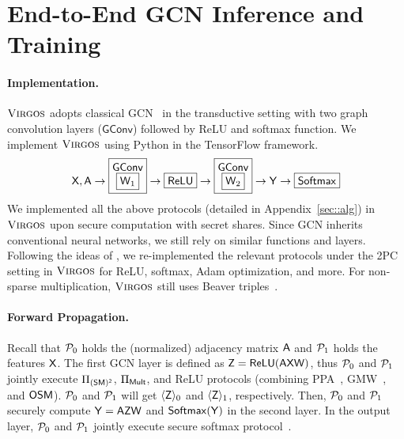 \section{End-to-End GCN Inference and Training}
\label{sec::secgcn}

\paragraph{Implementation.}
$\textnormal{\textsc{Virgos}}$ adopts classical GCN~\cite{iclr/KipfW17} in the transductive setting with
two graph convolution layers ($\mathsf{GConv}$) 
followed by ReLU and softmax function.
We implement $\textnormal{\textsc{Virgos}}$ using Python
in the TensorFlow framework.
\begin{equation*}
\begin{aligned}
\mathsf{X},\mathsf{A}
	\rightarrow 
\boxed{
	\stackrel{\textstyle{\mathsf{GConv}}}{\boxed{\mathsf{W}_{1}}}
}
	\rightarrow 
 	\boxed{ {\mathsf{{ReLU}}}}
	\rightarrow 
\boxed{
	\stackrel{\textstyle{\mathsf{GConv}}}{\boxed{\mathsf{W}_{2}}}
}
	\rightarrow
	\mathsf{Y}
	\rightarrow 
 	 	\boxed{ {\mathsf{{Softmax}}}} 
 	 	\end{aligned}
 	\end{equation*}
We implemented all the above protocols (detailed in Appendix~\ref{sec::alg}) in $\textnormal{\textsc{Virgos}}$
upon secure computation with secret shares.
Since GCN inherits conventional neural networks, we still rely on similar functions and layers.
Following the ideas of \cite{sp/MohasselZ17,ccs/RatheeRKCGRS20,uss/WatsonWP22,acsac/0021ZCPTLY23,popets/AttrapadungHIKM22},
we re-implemented the relevant protocols under the 2PC setting in $\textnormal{\textsc{Virgos}}$ for ReLU,
softmax, Adam optimization, and more.
For non-sparse multiplication, $\textnormal{\textsc{Virgos}}$ still uses Beaver triples~\cite{crypto/Beaver91a}.

\paragraph{Forward Propagation.}
Recall that $\mathcal{P}_0$ holds the (normalized) adjacency matrix $\mathsf{A}$ and $\mathcal{P}_1$ holds the features $\mathsf{X}$.
The first GCN layer is defined as $\mathsf{Z} =\mathsf{ReLU}(\mathsf{A}\mathsf{X} \mathsf{W})$, thus $\mathcal{P}_0$ and $\mathcal{P}_1$ jointly execute $\Pi_{\mathsf{(SM)^2}}$, $\Pi_{\mathsf{Mult}}$, and ReLU protocols (combining PPA~\cite{arith/Beaumont-SmithL01}, GMW~\cite{acssc/Harris03}, and $\mathsf{OSM}$).
$\mathcal{P}_0$ and $\mathcal{P}_1$ will get $\langle \mathsf{Z}\rangle_0$ and $\langle \mathsf{Z}\rangle_1$, respectively.
Then, $\mathcal{P}_0$ and $\mathcal{P}_1$ securely compute $\mathsf{Y}= \mathsf{A} \mathsf{Z} \mathsf{W}$ and $\mathsf{Softmax}(\mathsf{Y})$ in the second layer.
In the output layer, $\mathcal{P}_0$ and $\mathcal{P}_1$ jointly execute secure softmax protocol~\cite{acsac/0021ZCPTLY23}.

